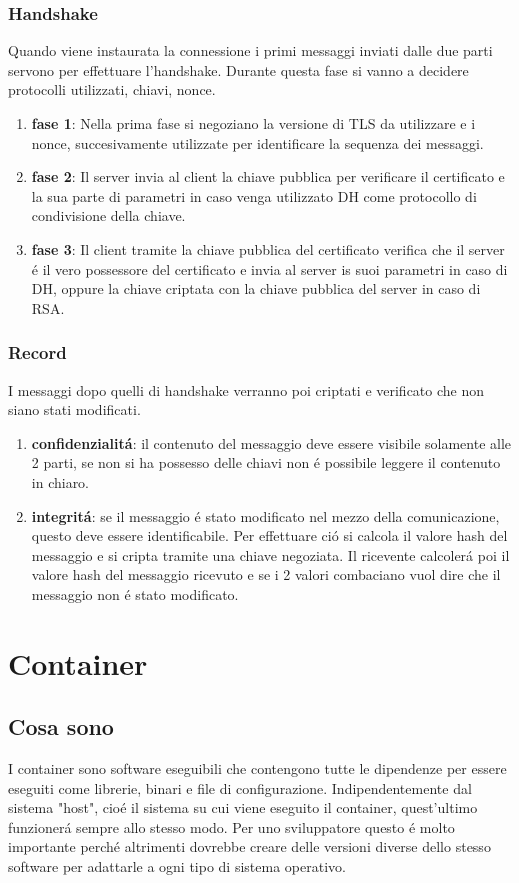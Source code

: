 \subsubsection{Handshake}
Quando viene instaurata la connessione i primi messaggi inviati dalle due parti servono per effettuare l'handshake. Durante questa fase si vanno a decidere protocolli utilizzati, chiavi, nonce.
\begin{enumerate}
  \item \textbf{fase 1}: Nella prima fase si negoziano la versione di TLS da utilizzare e i nonce, succesivamente utilizzate per identificare la sequenza dei messaggi.
  \item \textbf{fase 2}: Il server invia al client la chiave pubblica per verificare il certificato e la sua parte di parametri in caso venga utilizzato DH come protocollo di condivisione della chiave.
  \item \textbf{fase 3}: Il client tramite la chiave pubblica del certificato verifica che il server é il vero possessore del certificato e invia al server is suoi parametri in caso di DH, oppure la chiave criptata con la chiave pubblica del server in caso di RSA.
\end{enumerate}
\subsubsection{Record}
I messaggi dopo quelli di handshake verranno poi criptati e verificato che non siano stati modificati.
\begin{enumerate}
\item \textbf{confidenzialitá}: il contenuto del messaggio deve essere visibile solamente alle 2 parti, se non si ha possesso delle chiavi non é possibile leggere il contenuto in chiaro.
\item \textbf{integritá}: se il messaggio é stato modificato nel mezzo della comunicazione, questo deve essere identificabile. Per effettuare ció si calcola il valore hash del messaggio e si cripta tramite una chiave negoziata. Il ricevente calcolerá poi il valore hash del messaggio ricevuto e se i 2 valori combaciano vuol dire che il messaggio non é stato modificato.
\end{enumerate}

\section{Container}
\subsection{Cosa sono}
\cite{container}I container sono software eseguibili che contengono tutte le dipendenze per essere eseguiti come librerie, binari e file di configurazione. Indipendentemente dal sistema "host", cioé il sistema su cui viene eseguito il container, quest'ultimo funzionerá sempre allo stesso modo. Per uno sviluppatore questo é molto importante perché altrimenti dovrebbe creare delle versioni diverse dello stesso software per adattarle a ogni tipo di sistema operativo.
